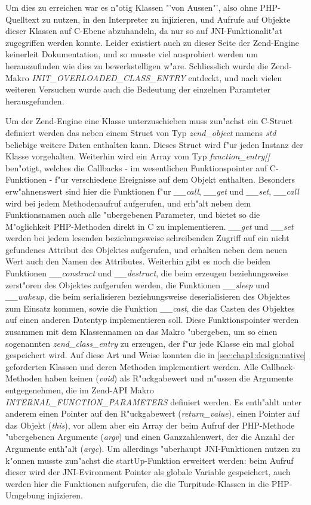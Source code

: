 Um dies zu erreichen war es n"otig Klassen "'von Aussen"', also ohne PHP-Quelltext zu nutzen, in den Interpreter zu injizieren,
und Aufrufe auf Objekte dieser Klassen auf C-Ebene abzuhandeln, da nur so auf JNI-Funktionalit"at zugegriffen werden konnte. 
Leider existiert auch zu dieser Seite der Zend-Engine keinerleit Dokumentation, und so musste viel ausprobiert werden um
herauszufinden wie dies zu bewerkstelligen w"are. Schliesslich wurde die Zend-Makro \emph{INIT\_OVERLOADED\_CLASS\_ENTRY} entdeckt,
und nach vielen weiteren Versuchen wurde auch die Bedeutung der einzelnen Paramteter herausgefunden.

Um der Zend-Engine eine Klasse unterzuschieben muss zun"achst ein C-Struct definiert werden das neben einem Struct von Typ
\emph{zend\_object} namens \emph{std} beliebige weitere Daten enthalten kann. Dieses Struct wird f"ur jeden Instanz der Klasse
vorgehalten. Weiterhin wird ein Array vom Typ \emph{function\_entry[]} ben"otigt, welches die Callbacks - im wesentlichen Funktionspointer
auf C-Funktionen - f"ur verschiedene Ereignisse auf dem Objekt enthalten. Besonders erw"ahnenswert sind hier die Funktionen f"ur 
\emph{\_\_call}, \emph{\_\_get} und \emph{\_\_set}, \emph{\_\_call} wird bei jedem Methodenaufruf aufgerufen, und erh"alt neben dem
Funktionsnamen auch alle "ubergebenen Parameter, und bietet so die M"oglichkeit PHP-Methoden direkt in C zu implementieren. 
\emph{\_\_get} und \emph{\_\_set} werden bei jedem lesenden beziehungsweise schreibenden Zugriff auf ein nicht gefundenes Attribut des
Objektes aufgerufen, und erhalten neben dem neuen Wert auch den Namen des Attributes. Weiterhin gibt es noch die beiden Funktionen
\emph{\_\_construct} und \emph{\_\_destruct}, die beim erzeugen beziehungsweise zerst"oren des Objektes aufgerufen werden,
die Funktionen \emph{\_\_sleep} und \emph{\_\_wakeup}, die beim serialisieren beziehungsweise deserialisieren des Objektes zum
Einsatz kommen, sowie die Funktion \emph{\_\_cast}, die das Casten des Objektes auf einen anderen Datentyp implementieren soll.
Diese Funktionspointer werden zusammen mit dem Klassennamen an das Makro "ubergeben, um so einen sogenannten \emph{zend\_class\_entry}
zu erzeugen, der f"ur jede Klasse ein mal global gespeichert wird.
Auf diese Art und Weise konnten die in 
\ref{sec:chap1:design:native} geforderten Klassen und deren Methoden implementiert werden. Alle Callback-Methoden haben keinen (\emph{void})
als R"uckgabewert und m"ussen die Argumente entgegenehmen, die im Zend-API Makro \emph{INTERNAL\_FUNCTION\_PARAMETERS} definiert werden.
Es enth"ahlt unter anderem einen Pointer auf den R"uckgabewert (\emph{return\_value}), einen Pointer auf das Objekt (\emph{this}), vor
allem aber ein Array der beim Aufruf der PHP-Methode "ubergebenen Argumente (\emph{argv}) und einen Ganzzahlenwert, der die Anzahl
der Argumente enth"alt (\emph{argc}).
Um allerdings "uberhaupt JNI-Funktionen nutzen zu k"onnen musste zun"achst die startUp-Funktion erweitert werden: beim Aufruf dieser
wird der JNI-Evironment Pointer als globale Variable gespeichert, auch werden hier die Funktionen aufgerufen, die die Turpitude-Klassen
in die PHP-Umgebung injizieren.

